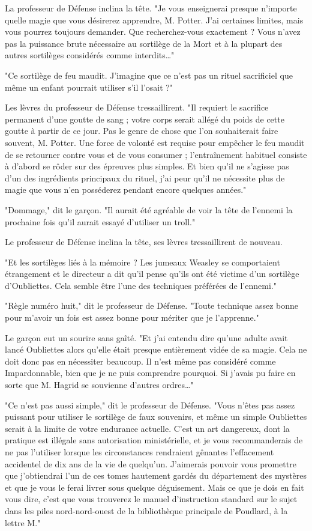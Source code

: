 La professeur de Défense inclina la tête. "Je vous enseignerai presque n'importe quelle magie que vous désirerez apprendre, M. Potter. J'ai certaines limites, mais vous pourrez toujours demander. Que recherchez-vous exactement ? Vous n'avez pas la puissance brute nécessaire au sortilège de la Mort et à la plupart des autres sortilèges considérés comme interdits…"

"Ce sortilège de feu maudit. J'imagine que ce n'est pas un rituel sacrificiel que même un enfant pourrait utiliser s'il l'osait ?"

Les lèvres du professeur de Défense tressaillirent. "Il requiert le sacrifice permanent d'une goutte de sang ; votre corps serait allégé du poids de cette goutte à partir de ce jour. Pas le genre de chose que l'on souhaiterait faire souvent, M. Potter. Une force de volonté est requise pour empêcher le feu maudit de se retourner contre vous et de vous consumer ; l'entraînement habituel consiste à d'abord se rôder sur des épreuves plus simples. Et bien qu'il ne s'agisse pas d'un des ingrédients principaux du rituel, j'ai peur qu'il ne nécessite plus de magie que vous n'en posséderez pendant encore quelques années."

"Dommage," dit le garçon. "Il aurait été agréable de voir la tête de l'ennemi la prochaine fois qu'il aurait essayé d'utiliser un troll."

Le professeur de Défense inclina la tête, ses lèvres tressaillirent de nouveau.

"Et les sortilèges liés à la mémoire ? Les jumeaux Weasley se comportaient étrangement et le directeur a dit qu'il pense qu'ils ont été victime d'un sortilège d'Oubliettes. Cela semble être l'une des techniques préférées de l'ennemi."

"Règle numéro huit," dit le professeur de Défense. "Toute technique assez bonne pour m'avoir un fois est assez bonne pour mériter que je l'apprenne."

Le garçon eut un sourire sans gaîté. "Et j'ai entendu dire qu'une adulte avait lancé Oubliettes alors qu'elle était presque entièrement vidée de sa magie. Cela ne doit donc pas en nécessiter beaucoup. Il n'est même pas considéré comme Impardonnable, bien que je ne puis comprendre pourquoi. Si j'avais pu faire en sorte que M. Hagrid se souvienne d'autres ordres…"

"Ce n'est pas aussi simple," dit le professeur de Défense. "Vous n'êtes pas assez puissant pour utiliser le sortilège de faux souvenirs, et même un simple Oubliettes serait à la limite de votre endurance actuelle. C'est un art dangereux, dont la pratique est illégale sans autorisation ministérielle, et je vous recommanderais de ne pas l'utiliser lorsque les circonstances rendraient gênantes l'effacement accidentel de dix ans de la vie de quelqu'un. J'aimerais pouvoir vous promettre que j'obtiendrai l'un de ces tomes hautement gardés du département des mystères et que je vous le ferai livrer sous quelque déguisement. Mais ce que je dois en fait vous dire, c'est que vous trouverez le manuel d'instruction standard sur le sujet dans les piles nord-nord-ouest de la bibliothèque principale de Poudlard, à la lettre M."

